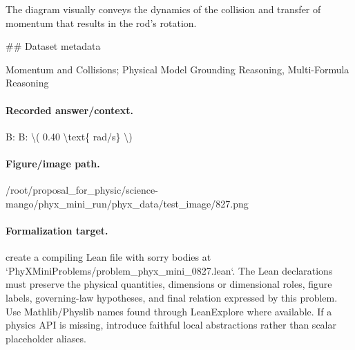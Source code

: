 The diagram visually conveys the dynamics of the collision and transfer of momentum that results in the rod's rotation.

\#\# Dataset metadata

Momentum and Collisions; Physical Model Grounding Reasoning, Multi-Formula Reasoning

\paragraph{Recorded answer/context.}
B: B: \textbackslash{}( 0.40 \textbackslash{}text\{ rad/s\} \textbackslash{})

\paragraph{Figure/image path.}
/root/proposal\_for\_physic/science-mango/phyx\_mini\_run/phyx\_data/test\_image/827.png

\paragraph{Formalization target.}
create a compiling Lean file with sorry bodies at `PhyXMiniProblems/problem\_phyx\_mini\_0827.lean`. The Lean declarations must preserve the physical quantities, dimensions or dimensional roles, figure labels, governing-law hypotheses, and final relation expressed by this problem.
Use Mathlib/Physlib names found through LeanExplore where available. If a physics API is missing, introduce faithful local abstractions rather than scalar placeholder aliases.

